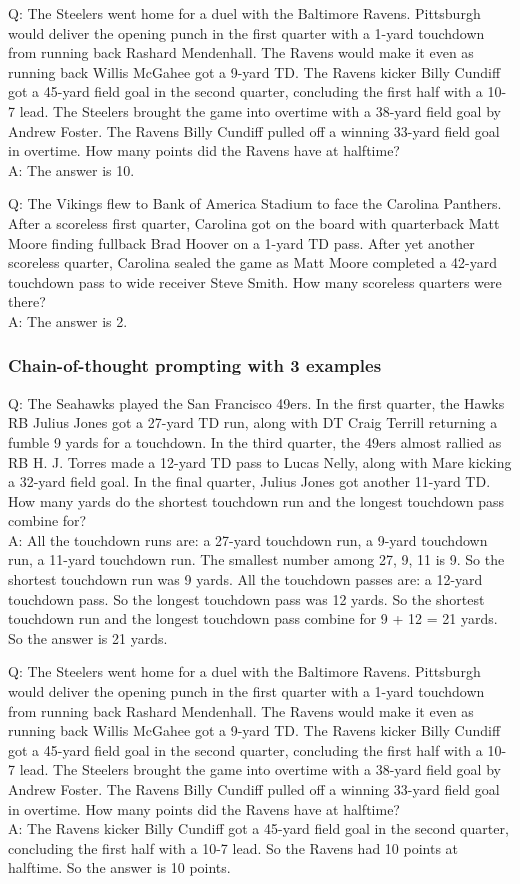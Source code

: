 Q: The Steelers went home for a duel with the Baltimore Ravens. Pittsburgh would deliver the opening punch in the first quarter with a 1-yard touchdown from running back Rashard Mendenhall. The Ravens would make it even as running back Willis McGahee got a 9-yard TD. The Ravens kicker Billy Cundiff got a 45-yard field goal in the second quarter, concluding the first half with a 10-7 lead. The Steelers brought the game into overtime with a 38-yard field goal by Andrew Foster. The Ravens Billy Cundiff pulled off a winning 33-yard field goal in overtime. How many points did the Ravens have at halftime?\\
A: The answer is 10.

Q: The Vikings flew to Bank of America Stadium to face the Carolina Panthers. After a scoreless first quarter, Carolina got on the board with quarterback Matt Moore finding fullback Brad Hoover on a 1-yard TD pass. After yet another scoreless quarter, Carolina sealed the game as Matt Moore completed a 42-yard touchdown pass to wide receiver Steve Smith. How many scoreless quarters were there?\\
A: The answer is 2.

\subsubsection{Chain-of-thought prompting with 3 examples}

Q: The Seahawks played the San Francisco 49ers. In the first quarter, the Hawks RB Julius Jones got a 27-yard TD run, along with DT Craig Terrill returning a fumble 9 yards for a touchdown. In the third quarter, the 49ers almost rallied as RB H. J. Torres made a 12-yard TD pass to Lucas Nelly, along with Mare kicking a 32-yard field goal. In the final quarter, Julius Jones got another 11-yard TD. How many yards do the shortest touchdown run and the longest touchdown pass combine for?\\
A: All the touchdown runs are: a 27-yard touchdown run, a 9-yard touchdown run, a 11-yard touchdown run. The smallest number among 27, 9, 11 is 9. So the shortest touchdown run was 9 yards. All the touchdown passes are: a 12-yard touchdown pass. So the longest touchdown pass was 12 yards. So the shortest touchdown run and the longest touchdown pass combine for 9 + 12 = 21 yards. So the answer is 21 yards.

Q: The Steelers went home for a duel with the Baltimore Ravens. Pittsburgh would deliver the opening punch in the first quarter with a 1-yard touchdown from running back Rashard Mendenhall. The Ravens would make it even as running back Willis McGahee got a 9-yard TD. The Ravens kicker Billy Cundiff got a 45-yard field goal in the second quarter, concluding the first half with a 10-7 lead. The Steelers brought the game into overtime with a 38-yard field goal by Andrew Foster. The Ravens Billy Cundiff pulled off a winning 33-yard field goal in overtime. How many points did the Ravens have at halftime?\\
A: The Ravens kicker Billy Cundiff got a 45-yard field goal in the second quarter, concluding the first half with a 10-7 lead.  So the Ravens had 10 points at halftime. So the answer is 10 points.

